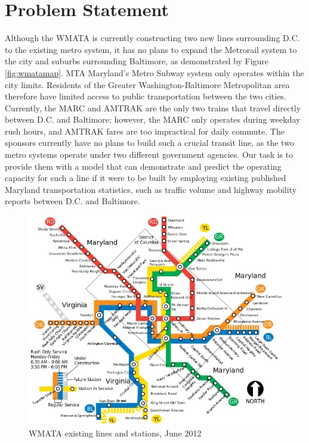 \documentclass[12pt,letterpaper]{article}
\theoremstyle{definition}
\begin{document}
\section{Problem Statement}
Although the WMATA is currently constructing two new lines surrounding D.C. to the existing metro system, it has no plans to expand the Metrorail system to the city and suburbs surrounding Baltimore, as demonstrated by Figure \ref{fig:wmatamap}. MTA Maryland's Metro Subway system only operates within the city limits. Residents of the Greater Washington-Baltimore Metropolitan area therefore have limited access to public transportation between the two cities. Currently, the MARC and AMTRAK are the only two trains that travel directly between D.C. and Baltimore; however, the MARC only operates during weekday rush hours, and AMTRAK fares are too impractical for daily commute. 
The sponsors currently have no plans to build such a crucial transit line, as the two metro systems operate under two different government agencies. Our task is to provide them with a model that can demonstrate and predict the operating capacity for such a line if it were to be built by employing existing published Maryland transportation statistics, such as traffic volume and highway mobility reports between D.C. and Baltimore.
\begin{figure}[h]
    \begin{center}
        \includegraphics[width=\textwidth]{WMATA_system_map.png}
    \end{center}
    \caption{WMATA existing lines and stations, June 2012}
\end{figure}
\end{document}
